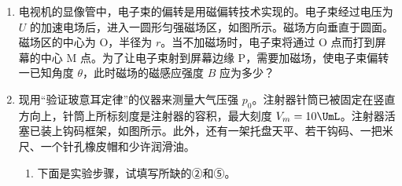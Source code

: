 \documentclass[\gkver]{gaokaozhenti}
\begin{document}
\begin{enumerate}
{$\Delta v=a\Delta t$ ④，

接触过程中运动员受到向上的弹力 $F$ 和向下的重力 $mg$，由牛顿第二定律得

$F-mg=ma$ ⑤，

由以上各式解得

$F=mg+m\frac{\sqrt{2gh_{2}}+\sqrt{2gh_{1}}}{\Delta t}$ ⑥，

代入数值得 $F=1.5\times10^{3}\UN$ ⑦。
}

\item
电视机的显像管中，电子束的偏转是用磁偏转技术实现的。电子束经过电压为 $U$ 的加速电场后，进入一圆形匀强磁场区，如图所示。磁场方向垂直于圆面。磁场区的中心为 O，半径为 $r$。当不加磁场时，电子束将通过 O 点而打到屏幕的中心 M 点。为了让电子束射到屏幕边缘 P，需要加磁场，使电子束偏转一已知角度 $\theta$，此时磁场的磁感应强度 $B$ 应为多少？



\item
现用“验证玻意耳定律”的仪器来测量大气压强 $p_{0}$。注射器针筒已被固定在竖直方向上，针筒上所标刻度是注射器的容积，最大刻度 $V_{m}=10\UmL$。注射器活塞已装上钩码框架，如图所示。此外，还有一架托盘天平、若干钩码、一把米尺、一个针孔橡皮帽和少许润滑油。

\begin{enumerate}
\item
下面是实验步骤，试填写所缺的②和⑤。


\end{enumerate}
\end{enumerate}
\end{document}
